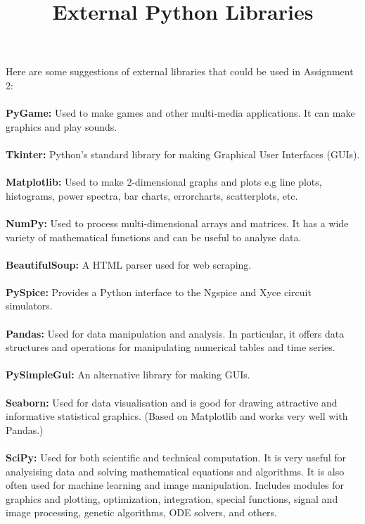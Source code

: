 \documentclass[12pt]{article}
\title{External Python Libraries}
\date{}
\begin{document}
\maketitle

\noindent Here are some suggestions of external libraries that could be used in Assignment 2:
\\
\\
\textbf{PyGame:} Used to make games and other multi-media applications. It can make graphics and play sounds.
\\
\\
\textbf{Tkinter:} Python's standard library for making Graphical User Interfaces (GUIs).
\\
\\
\textbf{Matplotlib:} Used to make 2-dimensional graphs and plots e.g line plots, histograms, power spectra, bar charts, errorcharts, scatterplots, etc. 
\\
\\
\textbf{NumPy:} Used to process multi-dimensional arrays and matrices. It has a wide variety of mathematical functions and can be useful to analyse data. 
\\
\\
\textbf{BeautifulSoup:} A HTML parser used for web scraping.
\\
\\
\textbf{PySpice:} Provides a Python interface to the Ngspice and Xyce circuit simulators.
\\
\\
\textbf{Pandas:} Used for data manipulation and analysis. In particular, it offers data structures and operations for manipulating numerical tables and time series. 
\\
\\
\textbf{PySimpleGui:} An alternative library for making GUIs.
\\
\\
\textbf{Seaborn: } Used for data visualisation and is good for drawing attractive and informative statistical graphics. (Based on Matplotlib and works very well with Pandas.)
\\
\\
\textbf{SciPy:} Used for both scientific and technical computation. It is very useful for analysising data and solving mathematical equations and algorithms. It is also often used for machine learning and image manipulation. Includes modules for graphics and plotting, optimization, integration, special functions, signal and image processing, genetic algorithms, ODE solvers, and others.
\end{document}
